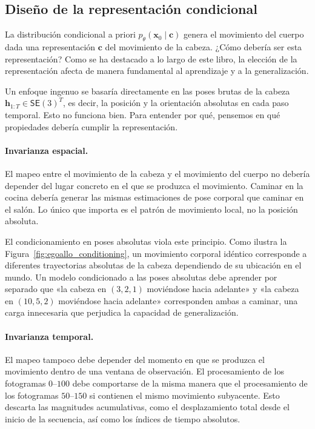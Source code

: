 \documentclass[../../book-main_es.tex]{subfiles}
\begin{document}
\subsection{Diseño de la representación condicional}
\label{sub:egoallo_representation}

La distribución condicional a priori $p_\theta(\boldsymbol{x}_0 \mid \boldsymbol{c})$ genera
el movimiento del cuerpo dada una representación $\boldsymbol{c}$ del movimiento de la cabeza. ¿Cómo
debería ser esta representación? Como se ha destacado a lo largo de este
libro, la elección de la representación afecta de manera fundamental al aprendizaje y a la generalización.

Un enfoque ingenuo se basaría directamente en las poses brutas de la cabeza
$\boldsymbol{h}_{1:T} \in \mathsf{SE}(3)^T$, es decir, la posición y la orientación absolutas
en cada paso temporal. Esto no funciona bien. Para entender por qué, pensemos en qué
propiedades debería cumplir la representación.

\paragraph{Invarianza espacial.}
El mapeo entre el movimiento de la cabeza y el movimiento del cuerpo no debería depender del
lugar concreto en el que se produzca el movimiento. Caminar en la cocina debería
generar las mismas estimaciones de pose corporal que caminar en el salón.
Lo único que importa es el patrón de movimiento local, no la posición absoluta.

El condicionamiento en poses absolutas viola este principio. Como
ilustra la Figura~\ref{fig:egoallo_conditioning}, un movimiento corporal
idéntico corresponde a diferentes trayectorias absolutas de la cabeza dependiendo
de su ubicación en el mundo. Un modelo condicionado a las poses absolutas debe aprender
por separado que «la cabeza en $(3,2,1)$ moviéndose hacia adelante» y «la cabeza en
$(10,5,2)$ moviéndose hacia adelante» corresponden ambas a caminar, una
carga innecesaria que perjudica la capacidad de generalización.

\paragraph{Invarianza temporal.}
El mapeo tampoco debe depender del momento en que se produzca el movimiento dentro de una ventana de observación.
El procesamiento de los fotogramas $0$--$100$ debe comportarse de la
misma manera que el procesamiento de los fotogramas $50$--$150$ si contienen el mismo
movimiento subyacente. Esto descarta las magnitudes acumulativas, como el desplazamiento total
desde el inicio de la secuencia, así como los índices de tiempo absolutos.
\end{document}
